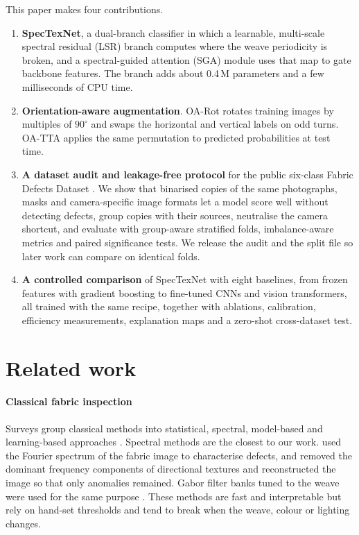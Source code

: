 \documentclass[preprint,12pt,authoryear]{elsarticle}
\begin{document}
This paper makes four contributions.
\begin{enumerate}
\item \textbf{SpecTexNet}, a dual-branch classifier in which a learnable, multi-scale spectral
residual (LSR) branch computes where the weave periodicity is broken, and a spectral-guided
attention (SGA) module uses that map to gate backbone features. The branch adds about 0.4\,M
parameters and a few milliseconds of CPU time.
\item \textbf{Orientation-aware augmentation}. OA-Rot rotates training images by multiples of
$90^\circ$ and swaps the horizontal and vertical labels on odd turns. OA-TTA applies the same
permutation to predicted probabilities at test time.
\item \textbf{A dataset audit and leakage-free protocol} for the public six-class Fabric Defects
Dataset \citep{kaggle_fabric}. We show that binarised copies of the same photographs, masks and
camera-specific image formats let a model score well without detecting defects, group copies with
their sources, neutralise the camera shortcut, and evaluate with group-aware stratified folds,
imbalance-aware metrics and paired significance tests. We release the audit and the split file so
later work can compare on identical folds.
\item \textbf{A controlled comparison} of SpecTexNet with eight baselines, from frozen features with
gradient boosting to fine-tuned CNNs and vision transformers, all trained with the same recipe,
together with ablations, calibration, efficiency measurements, explanation maps and a zero-shot
cross-dataset test.
\end{enumerate}

\section{Related work}
\label{sec:related}

\paragraph{Classical fabric inspection}
Surveys group classical methods into statistical, spectral, model-based and learning-based
approaches \citep{kumar2008survey,ngan2011review,hanbay2016review}. Spectral methods are the closest
to our work. \citet{chan2000fourier} used the Fourier spectrum of the fabric image to characterise
defects, and \citet{tsai1999directional} removed the dominant frequency components of directional
textures and reconstructed the image so that only anomalies remained. Gabor filter banks tuned to
the weave were used for the same purpose \citep{kumar2002gabor}. These methods are fast and
interpretable but rely on hand-set thresholds and tend to break when the weave, colour or lighting
changes.
\end{document}
